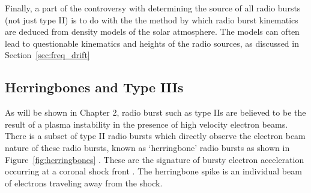 Finally, a part of the controversy with determining the source of all radio bursts (not just type II) is to do with the the method by which radio burst kinematics are deduced from density models of the solar atmosphere. The models can often lead to questionable kinematics and heights of the radio sources, as discussed in Section~\ref{sec:freq_drift}

\subsection{Herringbones and Type IIIs}

As will be shown in Chapter 2, radio burst such as type IIs are believed to be the result of a plasma instability in the presence of high velocity electron beams. There is a subset of type II radio bursts which directly observe the electron beam nature of these radio bursts, known as `herringbone' radio bursts as shown in Figure~\ref{fig:herringbones} \citep{cairns1987, cane1998}. These are the signature of bursty electron acceleration occurring at a coronal shock front \citep{mann2005}. The herringbone spike is an individual beam of electrons traveling away from the shock. 

